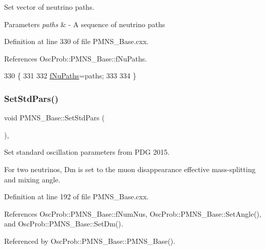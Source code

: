 Set vector of neutrino paths. 
\begin{DoxyParams}{Parameters}
{\em paths} & -\/ A sequence of neutrino paths \\
\hline
\end{DoxyParams}


Definition at line 330 of file P\+M\+N\+S\+\_\+\+Base.\+cxx.



References Osc\+Prob\+::\+P\+M\+N\+S\+\_\+\+Base\+::f\+Nu\+Paths.


\begin{DoxyCode}
330                                               \{
331 
332   \hyperlink{classOscProb_1_1PMNS__Base_a69db9d57e12fc7cbe0431bc6c18fac93}{fNuPaths}=paths;
333 
334 \}
\end{DoxyCode}
\mbox{\label{classOscProb_1_1PMNS__Base_a4de96ac9b6d1e9b029ab877e57d211ad}} 
\subsubsection{\texorpdfstring{Set\+Std\+Pars()}{SetStdPars()}}
{\footnotesize\ttfamily void P\+M\+N\+S\+\_\+\+Base\+::\+Set\+Std\+Pars (\begin{DoxyParamCaption}{ }\end{DoxyParamCaption})\hspace{0.3cm}{\ttfamily [virtual]}, {\ttfamily [inherited]}}

Set standard oscillation parameters from P\+DG 2015.

For two neutrinos, Dm is set to the muon disappearance effective mass-\/splitting and mixing angle. 

Definition at line 192 of file P\+M\+N\+S\+\_\+\+Base.\+cxx.



References Osc\+Prob\+::\+P\+M\+N\+S\+\_\+\+Base\+::f\+Num\+Nus, Osc\+Prob\+::\+P\+M\+N\+S\+\_\+\+Base\+::\+Set\+Angle(), and Osc\+Prob\+::\+P\+M\+N\+S\+\_\+\+Base\+::\+Set\+Dm().



Referenced by Osc\+Prob\+::\+P\+M\+N\+S\+\_\+\+Base\+::\+P\+M\+N\+S\+\_\+\+Base().


